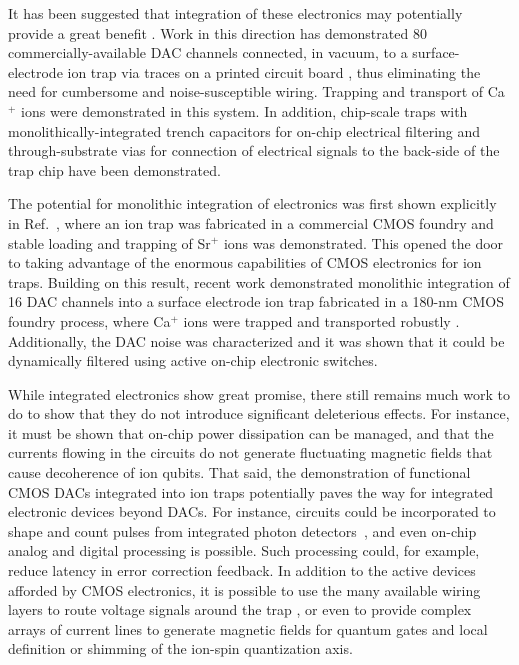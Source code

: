 \documentclass[%
reprint,
 amsmath,amssymb,
]{revtex4-1}
\begin{document}
It has been suggested that integration of these electronics may potentially provide a great benefit \cite{GuiseInVacElec2014, mehta_cmos_2014, LekitscheMicrowaveBlueprint2017, StuartDACTRap2018}.  Work in this direction has demonstrated 80 commercially-available DAC channels connected, in vacuum, to a surface-electrode ion trap via traces on a printed circuit board \cite{GuiseInVacElec2014}, thus eliminating the need for cumbersome and noise-susceptible wiring.  Trapping and transport of Ca$^+$ ions were demonstrated in this system.  In addition, chip-scale traps with monolithically-integrated trench capacitors for on-chip electrical filtering \cite{Allcock2012, GuiseBallGrid2015} and through-substrate vias for connection of electrical signals to the back-side of the trap chip \cite{GuiseBallGrid2015} have been demonstrated.

The potential for monolithic integration of electronics was first shown explicitly in Ref.~\cite{mehta_cmos_2014}, where an ion trap was fabricated in a commercial CMOS foundry and stable loading and trapping of Sr$^+$ ions was demonstrated.  This opened the door to taking advantage of the enormous capabilities of CMOS electronics for ion traps.  Building on this result, recent work demonstrated monolithic integration of 16 DAC channels into a surface electrode ion trap fabricated in a 180-nm CMOS foundry process, where Ca$^+$ ions were trapped and transported robustly \cite{StuartDACTRap2018}.  Additionally, the DAC noise was characterized and it was shown that it could be dynamically filtered using active on-chip electronic switches.

While integrated electronics show great promise, there still remains much work to do to show that they do not introduce significant deleterious effects.  For instance, it must be shown that on-chip power dissipation can be managed, and that the currents flowing in the circuits do not generate fluctuating magnetic fields that cause decoherence of ion qubits. That said, the demonstration of functional CMOS DACs integrated into ion traps potentially paves the way for integrated electronic devices beyond DACs.  For instance, circuits could be incorporated to shape and count pulses from integrated photon detectors~\cite{MehtaThesis2017}, and even on-chip analog and digital processing is possible.  Such processing could, for example, reduce latency in error correction feedback. In addition to the active devices afforded by CMOS electronics, it is possible to use the many available wiring layers to route voltage signals around the trap \cite{mehta_cmos_2014, StuartDACTRap2018}, or even to provide complex arrays of current lines to generate magnetic fields for quantum gates and local definition or shimming of the ion-spin quantization axis.
\end{document}
